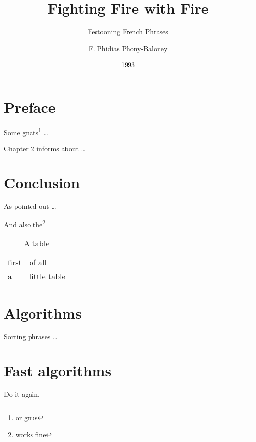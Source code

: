 \documentclass[10pt]{thesis}
\begin{document}
\frontmatter
\title{Fighting Fire with Fire}
\subtitle{Festooning French Phrases}
\author{F. Phidias Phony-Baloney}
\dedication{\em --- Jules and Jim ---}
\uppertitleback{Fanstord University Press}
\lowertitleback{Copyright $\copyright$ 1993 Phoney-Baloney}
\date{1993}

\maketitle

\tableofcontents 

\chapter{Preface}

Some gnats\footnote{or gnus} \dots

Chapter \ref{Chap:Conclusion} informs about \dots

\mainmatter

\chapter{Conclusion}
\label{Chap:Conclusion}

As pointed out \dots 

And also the\footnote{works fine}


\begin{table}[htbp]
  \begin{center}
    \leavevmode
    \begin{tabular}{ll}
      first & of all       \\
      a     & little table \\
    \end{tabular}
    \caption{A table}
    \label{tab:mytab}
  \end{center}
\end{table}



\appendix

\chapter{Algorithms}

Sorting phrases \dots 

\chapter{Fast algorithms}

Do it again.
\end{document}
